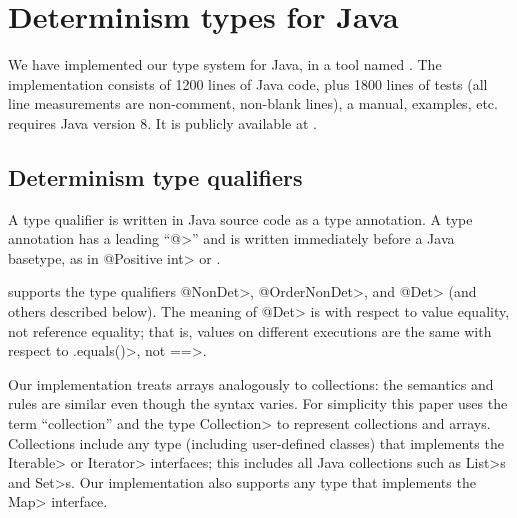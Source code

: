 \section{Determinism types for Java}\label{sec:java-types}

We have implemented our type system for Java, in a tool named \theDeterminismChecker.
The implementation consists of 1200 lines of Java
code, plus 1800 lines of tests (all line measurements are non-comment,
non-blank lines), a manual, examples, etc.
\TheDeterminismChecker requires Java version 8.
It is publicly available at
.


\subsection{Determinism type qualifiers}

A type qualifier is written in Java source code as a type annotation.
A type annotation has a leading ``\<@>'' and is written immediately before a
Java basetype, as in \<@Positive int> or .

\TheDeterminismChecker supports the type qualifiers \<@NonDet>,
\<@OrderNonDet>, and \<@Det> (and others described below).
The meaning of \<@Det> is with respect to value
equality, not reference equality; that is,
values on different executions are the same with respect to \<.equals()>,
not \<==>.

Our implementation treats arrays analogously to collections:
the semantics and rules are similar even though the syntax varies.
For simplicity this
paper uses the term ``collection'' and the type \<Collection> to represent
collections and arrays.
Collections include any type (including user-defined classes) that
implements the \<Iterable> or \<Iterator> interfaces; this includes all
Java collections such as \<List>s and \<Set>s.
Our implementation also supports any type that implements the \<Map>
interface.


